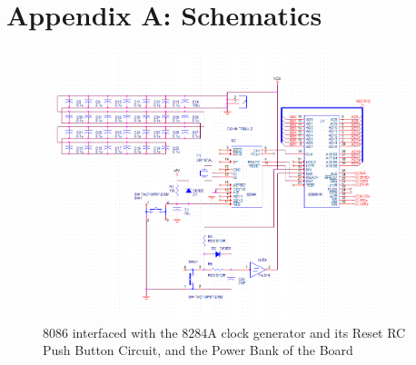 \newpage

\appendix {}

    \section{Appendix A: Schematics} \label{appendix:schematics}

        \begin{figure}[ht]
            \begin{center}
                \includegraphics[width=0.95\textwidth]{figures/schematics/page1.png}
                \caption{8086 interfaced with the 8284A clock generator and its Reset RC Push Button Circuit, and the Power Bank of the Board} \label{fig:page1}
            \end{center}
        \end{figure}

